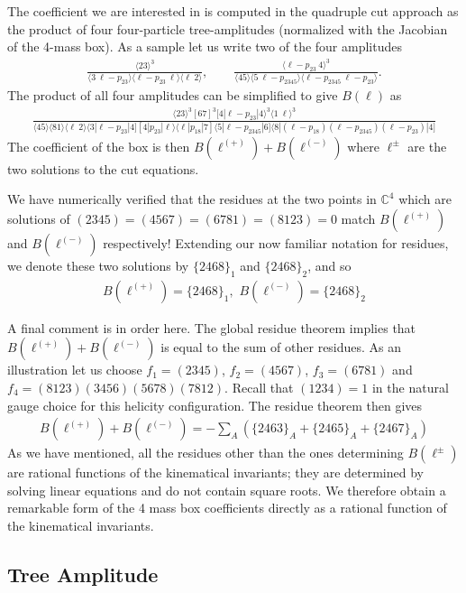 \documentclass[12pt]{article}
\newcommand{\be}{\begin{eqnarray}}
\newcommand{\ee}{\end{eqnarray}}
\begin{document}
The coefficient we are interested in is computed in the quadruple cut approach as the product of four four-particle tree-amplitudes (normalized with the Jacobian of the 4-mass box). As a sample let us write two of the four amplitudes
%
\be
\frac{\langle 23\rangle^3}{\langle 3~\ell-p_{23}\rangle\langle \ell-p_{23}~\ell\rangle\langle \ell~2\rangle},\qquad \frac{\langle \ell-p_{23}~4\rangle^3}{\langle 45\rangle\langle 5~\ell-p_{2345}\rangle\langle \ell-p_{2345}~\ell-p_{23}\rangle}.
\ee
%
The product of all four amplitudes can be simplified to give $B(\ell)$ as
%
\be\nonumber
\frac{\langle 23\rangle^3[67]^3[4|\ell-p_{23}|4\rangle^3\langle 1~\ell\rangle^3}{\langle 45\rangle\langle 81\rangle\langle \ell~2\rangle\langle 3|\ell-p_{23}|4][4|p_{23}|\ell\rangle\langle\ell|p_{18}|7]\langle 5|\ell-p_{2345}|6]\langle 8|(\ell-p_{18})(\ell-p_{2345})(\ell-p_{23})|4]}
\ee
%
The coefficient of the box is then $B(\ell^{(+)}) + B(\ell^{(-)})$ where $\ell^{\pm}$ are the two solutions to the cut equations.

We have numerically verified that the residues at the two points in $\mathbb{C}^4$ which are solutions of $(2345)=(4567)=(6781)=(8123)=0$ match $B(\ell^{(+)})$ and $B(\ell^{(-)})$ respectively! Extending our now familiar notation for residues, we denote these two solutions by $\{2468\}_1$ and $\{2468\}_2$, and so
\be
B(\ell^{(+)}) = \{2468\}_1, \, \, B(\ell^{(-)}) = \{2468\}_2
\ee

A final comment is in order here. The global residue theorem implies
that $B(\ell^{(+)}) + B(\ell^{(-)})$ is equal to the sum of other
residues. As an illustration let us choose $f_1=(2345)$,
$f_2=(4567)$, $f_3=(6781)$ and $f_4=(8123)(3456)(5678)(7812)$.
Recall that $(1234)=1$ in the natural gauge choice for this helicity
configuration. The residue theorem then gives
\be
B(\ell^{(+)}) + B(\ell^{(-)}) = - \sum_{A} \left( \{2463\}_A +
\{2465\}_A + \{2467\}_A \right)
\ee
%
As we have mentioned, all the residues
other than the ones determining $B(\ell^{\pm})$ are rational
functions of the kinematical invariants; they are determined by
solving linear equations and do not contain square roots. We
therefore obtain a remarkable form of the 4 mass box coefficients
directly as a rational function of the kinematical invariants.

\subsection{Tree Amplitude}
\end{document}
